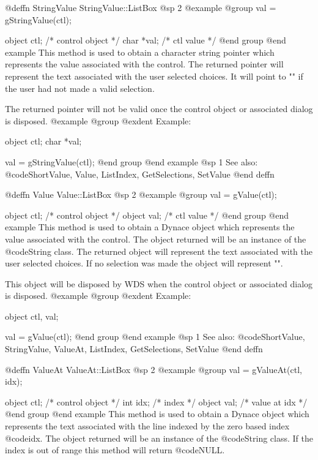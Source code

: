 @deffn {StringValue} StringValue::ListBox
@sp 2
@example
@group
val = gStringValue(ctl);

object  ctl;   /*  control object  */
char    *val;  /*  ctl value       */
@end group
@end example
This method is used to obtain a character string pointer which
represents the value associated with the control.  The returned pointer
will represent the text associated with the user selected choices.
It will point to "" if the user had not made a valid selection.

The returned pointer will not be valid once the control object or
associated dialog is disposed.
@example
@group
@exdent Example:

object  ctl;
char    *val;

val = gStringValue(ctl);
@end group
@end example
@sp 1
See also:  @code{ShortValue, Value, ListIndex, GetSelections, SetValue}
@end deffn










@deffn {Value} Value::ListBox
@sp 2
@example
@group
val = gValue(ctl);

object  ctl;   /*  control object  */
object  val;   /*  ctl value       */
@end group
@end example
This method is used to obtain a Dynace object which represents the value
associated with the control.  The object returned will be an instance of
the @code{String} class.  The returned object will represent the text
associated with the user selected choices.  If no selection was made
the object will represent "".

This object will be disposed by WDS when the control object or
associated dialog is disposed.
@example
@group
@exdent Example:

object  ctl, val;

val = gValue(ctl);
@end group
@end example
@sp 1
See also:  @code{ShortValue, StringValue, ValueAt, ListIndex, GetSelections, SetValue}
@end deffn









@deffn {ValueAt} ValueAt::ListBox
@sp 2
@example
@group
val = gValueAt(ctl, idx);

object  ctl;   /*  control object  */
int     idx;   /*  index           */
object  val;   /*  value at idx    */
@end group
@end example
This method is used to obtain a Dynace object which represents the text
associated with the line indexed by the zero based index @code{idx}.
The object returned will be an instance of the @code{String} class.  If
the index is out of range this method will return @code{NULL}.


